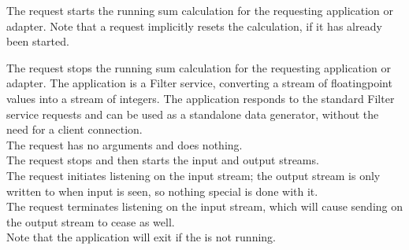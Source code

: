 The  request starts the running sum
calculation for the requesting application or adapter.
Note that a  request implicitly resets the
calculation, if it has already been started.\\
%

The  request stops the running sum
calculation for the requesting application or adapter.
%
The  application is a Filter
service, converting a stream of floating\longDash{}point values into a stream of integers.
The application responds to the standard Filter service requests and can be used as a
standalone data generator, without the need for a client connection.\\

The  request has no arguments and
does nothing.\\

The  request stops and then
starts the input and output streams.\\

The  request initiates listening
on the input stream; the output stream is only written to when input is seen, so nothing
special is done with it.\\

The  request terminates listening
on the input stream, which will cause sending on the output stream to cease as well.\\

Note that the application will exit if the
 is not running.\\

\insertAppParameters{}
\insertFilterServiceComment{}\\

